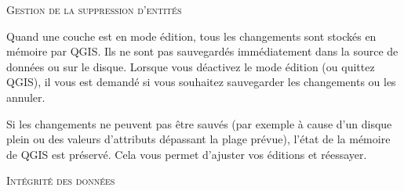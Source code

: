 \begin{itemize}
\begin{Astuce}[ht]\caption{\textsc{Gestion de la suppression d'entités}}
\end{Astuce}


Quand une couche est en mode édition, tous les changements sont stockés en mémoire par QGIS. Ils ne sont pas sauvegardés immédiatement dans la source de données ou sur le disque. Lorsque vous déactivez le mode édition (ou quittez QGIS), il vous est demandé si vous souhaitez sauvegarder les changements ou les annuler.

Si les changements ne peuvent pas être sauvés (par exemple à cause d'un disque plein ou des valeurs d'attributs dépassant la plage prévue), l'état de la mémoire de QGIS est préservé. Cela vous permet d'ajuster vos éditions et réessayer.

\begin{Astuce}[ht]\caption{\textsc{Intégrité des données}}
\end{Astuce}



\end{itemize}
